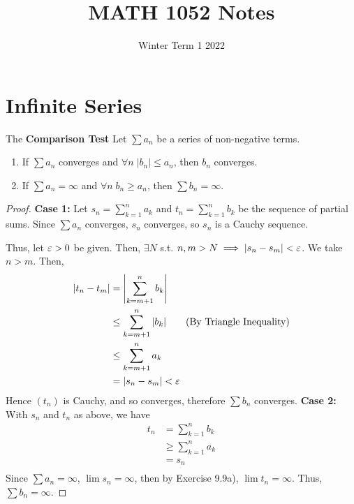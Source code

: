 \documentclass{article}
\begin{document}
\title{MATH 1052 Notes}
\date{Winter Term 1 2022}
\maketitle

\begin{tcolorbox}[title=, fonttitle=\huge\sffamily\bfseries\selectfont,interior style={left color=contcol1!40!white,right color=contcol2!40!white},frame style={left color=contcol1!80!white,right color=contcol2!80!white},coltitle=black,top=2mm,bottom=2mm,left=2mm,right=2mm,drop fuzzy shadow,enhanced,breakable]
\tableofcontents
\end{tcolorbox}


\newpage
\section{Infinite Series}
\begin{cthm}[Theorem 14.6]
The \textbf{Comparison Test} \newline
Let $\sum{a_n}$ be a series of non-negative terms.
\begin{enumerate}
    \item If $\sum{a_n}$ converges and $\forall n \;|b_n| \leq a_n $, then $b_n$ converges.
    \item If $\sum{a_n} = \infty$ and $\forall n \; b_n \geq a_n$, then $\sum{b_n} = \infty$.
\end{enumerate}
\end{cthm}
\begin{proof}
\textbf{Case 1:} \newline
Let $s_n = \sum_{k=1}^n a_k$ and $t_n = \sum_{k=1}^n b_k$ be the sequence of partial sums. Since $\sum a_n$ converges, $s_n$ converges, so $s_n$ is a Cauchy sequence.

Thus, let $\varepsilon > 0$ be given. Then, $\exists N$ s.t. $n, m > N \implies |s_n - s_m| < \varepsilon$.
We take $n > m$. Then,
\begin{align*}
    |t_n - t_m| &= \left|\sum_{k = m+1}^n b_k\right|\\
    &\leq \sum_{k=m+1}^n |b_k| \tag{By Triangle Inequality}\\
    &\leq \sum_{k=m+1}^n a_k\\
    &= |s_n - s_m| < \varepsilon\\
\end{align*}
Hence $(t_n)$ is Cauchy, and so converges, therefore $\sum b_n$ converges.
\newline
\textbf{Case 2:}\newline
With $s_n$ and $t_n$ as above, we have
\begin{align*}
    t_n &= \sum_{k=1}^n b_k\\
    &\geq \sum_{k=1}^n a_k\\
    &= s_n\\
\end{align*}
Since $\sum a_n = \infty$, $\lim s_n = \infty$, then by Exercise 9.9a), $\lim t_n = \infty$. Thus, $\sum b_n = \infty$.
\end{proof}
\end{document}

